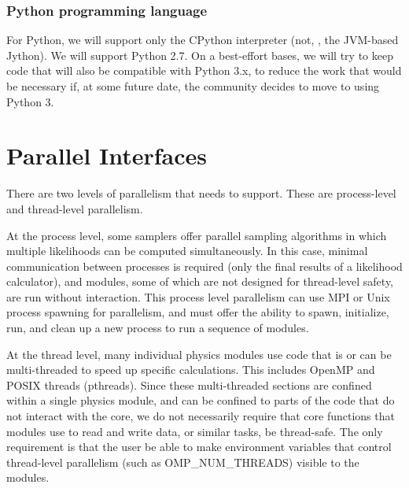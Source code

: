 \documentclass{memarticle}
\newcommand{\cosmosis}{\name{CosmoSIS}\xspace}
\begin{document}
\subsubsection{Python programming language}

For Python, we will support only the CPython interpreter (not, \eg, the
JVM-based Jython). We will support Python 2.7. On a best-effort bases,
we will try to keep code that will also be compatible with Python 3.x,
to reduce the work that would be necessary if, at some future date, the
community decides to move to using Python 3.

\section{Parallel Interfaces}


There are two levels of parallelism that \cosmosis needs to support.  These are
process-level and thread-level parallelism.

At the process level, some samplers 
offer parallel sampling algorithms in which multiple likelihoods can be computed 
simultaneously.  In this case, minimal communication between processes is required
(only the final results of a likelihood calculator), and modules, some of which are
not designed for thread-level safety, are run without interaction.  This process level
parallelism can use MPI or Unix process spawning for parallelism, and \cosmosis must offer
the ability to spawn, initialize, run, and clean up a new process to run a sequence of modules.

At the thread level, many individual physics modules use code that is or can be multi-threaded
to speed up specific calculations. This includes OpenMP and POSIX threads (pthreads).  Since these
multi-threaded sections are confined within a single physics module, and can be confined to 
parts of the code that do not interact with the \cosmosis core, we do not necessarily require that core functions
that modules use to read and write data, or similar tasks, be thread-safe.  The only requirement
is that the user be able to make environment variables that control thread-level parallelism
(such as OMP\_NUM\_THREADS) visible to the modules.
\end{document}
